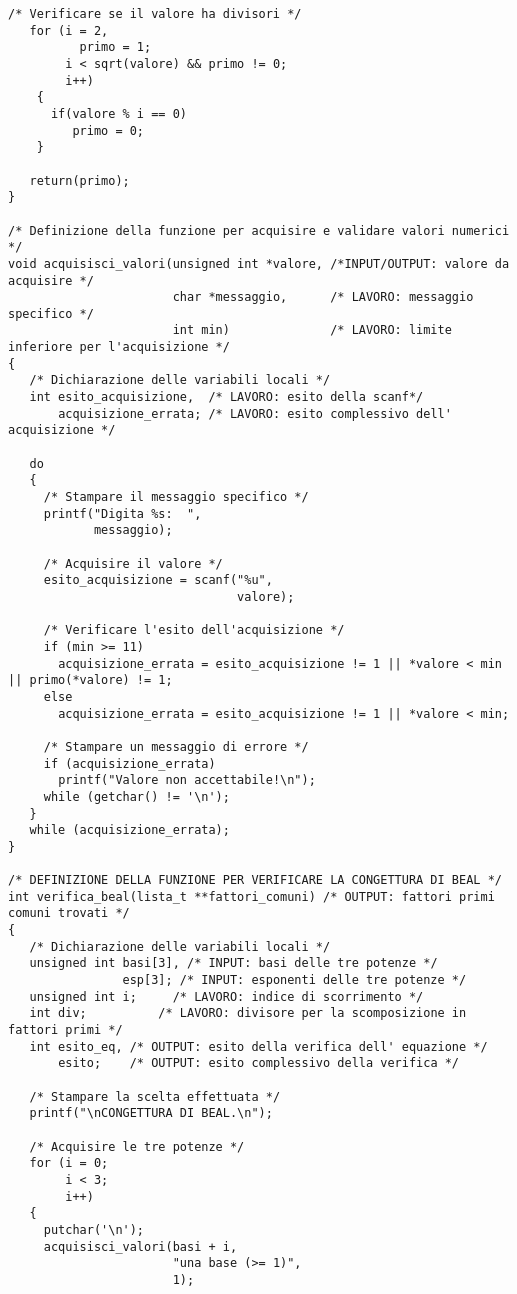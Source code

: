 \documentclass[10pt]{report}
\begin{document}
\begin{lstlisting}[label = {lst:codiceSorgente}]
   /* Verificare se il valore ha divisori */
   for (i = 2,
          primo = 1;
        i < sqrt(valore) && primo != 0; 
   	    i++)
	{
   	  if(valore % i == 0)
   	     primo = 0;
   	}   

   return(primo);
}

/* Definizione della funzione per acquisire e validare valori numerici */
void acquisisci_valori(unsigned int *valore, /*INPUT/OUTPUT: valore da acquisire */
                       char *messaggio,      /* LAVORO: messaggio specifico */
                       int min)              /* LAVORO: limite inferiore per l'acquisizione */
{   
   /* Dichiarazione delle variabili locali */
   int esito_acquisizione,  /* LAVORO: esito della scanf*/
       acquisizione_errata; /* LAVORO: esito complessivo dell' acquisizione */
   
   do
   {
   	 /* Stampare il messaggio specifico */
   	 printf("Digita %s:  ", 
   	        messaggio);   

   	 /* Acquisire il valore */
   	 esito_acquisizione = scanf("%u", 
   	                            valore);
        
   	 /* Verificare l'esito dell'acquisizione */
   	 if (min >= 11)		
   	   acquisizione_errata = esito_acquisizione != 1 || *valore < min || primo(*valore) != 1;	
   	 else
   	   acquisizione_errata = esito_acquisizione != 1 || *valore < min;		
   	    
   	 /* Stampare un messaggio di errore */
   	 if (acquisizione_errata)
   	   printf("Valore non accettabile!\n");
   	 while (getchar() != '\n');
   } 
   while (acquisizione_errata);
}

/* DEFINIZIONE DELLA FUNZIONE PER VERIFICARE LA CONGETTURA DI BEAL */
int verifica_beal(lista_t **fattori_comuni) /* OUTPUT: fattori primi comuni trovati */
{   
   /* Dichiarazione delle variabili locali */
   unsigned int basi[3], /* INPUT: basi delle tre potenze */
                esp[3]; /* INPUT: esponenti delle tre potenze */
   unsigned int i;     /* LAVORO: indice di scorrimento */
   int div;          /* LAVORO: divisore per la scomposizione in fattori primi */
   int esito_eq, /* OUTPUT: esito della verifica dell' equazione */
   	   esito;    /* OUTPUT: esito complessivo della verifica */

   /* Stampare la scelta effettuata */
   printf("\nCONGETTURA DI BEAL.\n");
   
   /* Acquisire le tre potenze */
   for (i = 0; 
        i < 3; 
        i++)
   {   
   	 putchar('\n');
   	 acquisisci_valori(basi + i, 
   	                   "una base (>= 1)", 
   	                   1);


\end{lstlisting}
\end{document}
